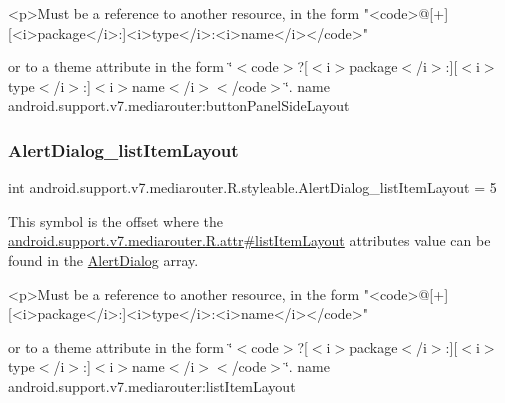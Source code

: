 \begin{DoxyVerb}      <p>Must be a reference to another resource, in the form "<code>@[+][<i>package</i>:]<i>type</i>:<i>name</i></code>"
\end{DoxyVerb}
 or to a theme attribute in the form \char`\"{}$<$code$>$?\mbox{[}$<$i$>$package$<$/i$>$\+:\mbox{]}\mbox{[}$<$i$>$type$<$/i$>$\+:\mbox{]}$<$i$>$name$<$/i$>$$<$/code$>$\char`\"{}.  name android.\+support.\+v7.\+mediarouter\+:button\+Panel\+Side\+Layout \mbox{\label{classandroid_1_1support_1_1v7_1_1mediarouter_1_1R_1_1styleable_a3f39b9e36a043ea5be32a9b38cd3fadc}} 
\subsubsection{\texorpdfstring{Alert\+Dialog\+\_\+list\+Item\+Layout}{AlertDialog\_listItemLayout}}
{\footnotesize\ttfamily int android.\+support.\+v7.\+mediarouter.\+R.\+styleable.\+Alert\+Dialog\+\_\+list\+Item\+Layout = 5\hspace{0.3cm}{\ttfamily [static]}}

This symbol is the offset where the \hyperlink{classandroid_1_1support_1_1v7_1_1mediarouter_1_1R_1_1attr_af5109bbc00fa0963f8746508b2e0d24b}{android.\+support.\+v7.\+mediarouter.\+R.\+attr\#list\+Item\+Layout} attribute\textquotesingle{}s value can be found in the \hyperlink{classandroid_1_1support_1_1v7_1_1mediarouter_1_1R_1_1styleable_a2c8307beccb0eb2a93adf87cab8ef939}{Alert\+Dialog} array.

\begin{DoxyVerb}      <p>Must be a reference to another resource, in the form "<code>@[+][<i>package</i>:]<i>type</i>:<i>name</i></code>"
\end{DoxyVerb}
 or to a theme attribute in the form \char`\"{}$<$code$>$?\mbox{[}$<$i$>$package$<$/i$>$\+:\mbox{]}\mbox{[}$<$i$>$type$<$/i$>$\+:\mbox{]}$<$i$>$name$<$/i$>$$<$/code$>$\char`\"{}.  name android.\+support.\+v7.\+mediarouter\+:list\+Item\+Layout \mbox{\label{classandroid_1_1support_1_1v7_1_1mediarouter_1_1R_1_1styleable_adb558027c7238facf23ec10cef40dce0}} 
